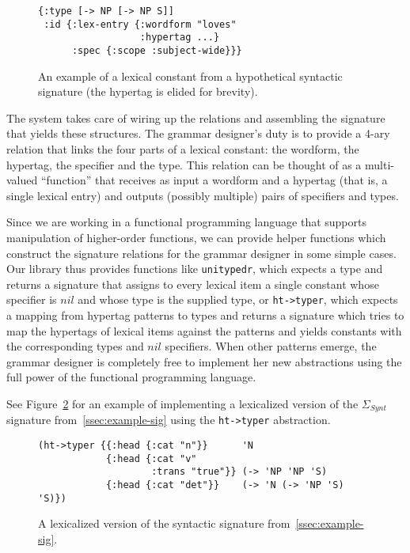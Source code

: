 \begin{figure}[h]
  \centering
\begin{verbatim}
{:type [-> NP [-> NP S]]
 :id {:lex-entry {:wordform "loves"
                  :hypertag ...}
      :spec {:scope :subject-wide}}}
\end{verbatim}
  \caption{\label{fig:lex-const} An example of a lexical constant from a
    hypothetical syntactic signature (the hypertag is elided for brevity).}
\end{figure}

The system takes care of wiring up the relations and assembling the
signature that yields these structures. The grammar designer's duty is
to provide a 4-ary relation that links the four parts of a lexical
constant: the wordform, the hypertag, the specifier and the type. This
relation can be thought of as a multi-valued ``function'' that receives
as input a wordform and a hypertag (that is, a single lexical entry) and
outputs (possibly multiple) pairs of specifiers and types.

Since we are working in a functional programming language that supports
manipulation of higher-order functions, we can provide helper functions
which construct the signature relations for the grammar designer in some
simple cases. Our library thus provides functions like
\texttt{unitypedr}, which expects a type and returns a signature that
assigns to every lexical item a single constant whose specifier is $nil$
and whose type is the supplied type, or \texttt{ht->typer}, which
expects a mapping from hypertag patterns to types and returns a
signature which tries to map the hypertags of lexical items against the
patterns and yields constants with the corresponding types and $nil$
specifiers. When other patterns emerge, the grammar designer is
completely free to implement her new abstractions using the full power
of the functional programming language.

See Figure~\ref{fig:lex-sig-impl} for an example of implementing a
lexicalized version of the $\Sigma_{Synt}$ signature
from~\ref{ssec:example-sig} using the \texttt{ht->typer} abstraction.

\begin{figure}
  \centering
\begin{verbatim}
(ht->typer {{:head {:cat "n"}}      'N
            {:head {:cat "v"
                    :trans "true"}} (-> 'NP 'NP 'S)
            {:head {:cat "det"}}    (-> 'N (-> 'NP 'S) 'S)})
\end{verbatim}
  \caption{\label{fig:lex-sig-impl} A lexicalized version of the
    syntactic signature from~\ref{ssec:example-sig}.}
\end{figure}

